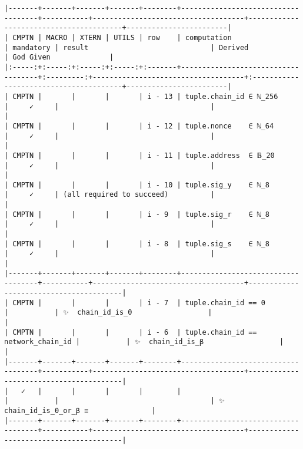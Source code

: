 \documentclass[varwidth=\maxdimen,margin=0.5cm,multi={verbatim}]{standalone}
\begin{document}
\begin{verbatim}
|-------+-------+-------+-------+--------+------------------------------------+-----------+------------------------------------+----------------------------------------+------------------------|
| CMPTN | MACRO | XTERN | UTILS | row    | computation                        | mandatory | result                             | Derived                                | God Given              |
|:-----:+:-----:+:-----:+:-----:+:-------+------------------------------------+:---------:+------------------------------------+:---------------------------------------+------------------------|
| CMPTN |       |       |       | i - 13 | tuple.chain_id ∈ ℕ_256             |     ✓     |                                    |                                        |
| CMPTN |       |       |       | i - 12 | tuple.nonce    ∈ ℕ_64              |     ✓     |                                    |                                        |
| CMPTN |       |       |       | i - 11 | tuple.address  ∈ 𝔹_20              |     ✓     |                                    |                                        |
| CMPTN |       |       |       | i - 10 | tuple.sig_y    ∈ ℕ_8               |     ✓     | (all required to succeed)          |                                        |
| CMPTN |       |       |       | i - 9  | tuple.sig_r    ∈ ℕ_8               |     ✓     |                                    |                                        |
| CMPTN |       |       |       | i - 8  | tuple.sig_s    ∈ ℕ_8               |     ✓     |                                    |                                        |
|-------+-------+-------+-------+--------+------------------------------------+-----------+------------------------------------+----------------------------------------|
| CMPTN |       |       |       | i - 7  | tuple.chain_id == 0                |           | ✨  chain_id_is_0                  |                                        |
| CMPTN |       |       |       | i - 6  | tuple.chain_id == network_chain_id |           | ✨  chain_id_is_β                  |                                        |
|-------+-------+-------+-------+--------+------------------------------------+-----------+------------------------------------+----------------------------------------|
|   ✓   |       |       |       |        |                                    |           |                                    | ✨  chain_id_is_0_or_β ≡               |
|-------+-------+-------+-------+--------+------------------------------------+-----------+------------------------------------+----------------------------------------|

\end{verbatim}
\end{document}
